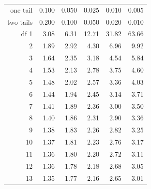 \begin{center}
\begin{tabular}{r | rrr rr}
\hline
one tail & \hspace{1.5mm}  0.100 & \hspace{1.5mm} 0.050 & \hspace{1.5mm} 0.025 & \hspace{1.5mm} 0.010 & \hspace{1.5mm} 0.005  \\
two tails & 0.200 & 0.100 & 0.050 & 0.020 & 0.010 \\
\hline
{df} \hfill 1  &  {\normalsize  3.08} & {\normalsize  6.31} & {\normalsize 12.71} & {\normalsize 31.82} & {\normalsize 63.66}  \\ 
2  &  {\normalsize  1.89} & {\normalsize  2.92} & {\normalsize  4.30} & {\normalsize  6.96} & {\normalsize  9.92}  \\ 
3  &  {\normalsize  1.64} & {\normalsize  2.35} & {\normalsize  3.18} & {\normalsize  4.54} & {\normalsize  5.84}  \\ 
4  &  {\normalsize  1.53} & {\normalsize  2.13} & {\normalsize  2.78} & {\normalsize  3.75} & {\normalsize  4.60}  \\ 
5  &  {\normalsize  1.48} & {\normalsize  2.02} & {\normalsize  2.57} & {\normalsize  3.36} & {\normalsize  4.03}  \\ 
\hline
6  &  {\normalsize  1.44} & {\normalsize  1.94} & {\normalsize  2.45} & {\normalsize  3.14} & {\normalsize  3.71}  \\ 
7  &  {\normalsize  1.41} & {\normalsize  1.89} & {\normalsize  2.36} & {\normalsize  3.00} & {\normalsize  3.50}  \\ 
8  &  {\normalsize  1.40} & {\normalsize  1.86} & {\normalsize  2.31} & {\normalsize  2.90} & {\normalsize  3.36}  \\ 
9  &  {\normalsize  1.38} & {\normalsize  1.83} & {\normalsize  2.26} & {\normalsize  2.82} & {\normalsize  3.25}  \\ 
10  &  {\normalsize  1.37} & {\normalsize  1.81} & {\normalsize  2.23} & {\normalsize  2.76} & {\normalsize  3.17}  \\ 
\hline
\hline
11  &  {\normalsize  1.36} & {\normalsize  1.80} & {\normalsize  2.20} & {\normalsize  2.72} & {\normalsize  3.11}  \\ 
12  &  {\normalsize  1.36} & {\normalsize  1.78} & {\normalsize  2.18} & {\normalsize  2.68} & {\normalsize  3.05}  \\ 
13  &  {\normalsize  1.35} & {\normalsize  1.77} & {\normalsize  2.16} & {\normalsize  2.65} & {\normalsize  3.01}  \\ 

\end{tabular}
\end{center}
